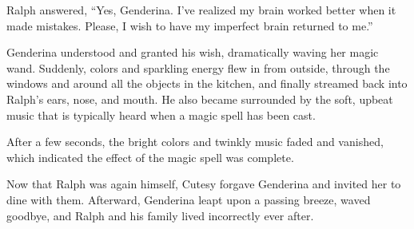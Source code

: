 Ralph answered, “Yes, Genderina. I've realized my brain worked better when it made mistakes. Please, I wish to have my imperfect brain returned to me.”

Genderina understood and granted his wish, dramatically waving her magic wand. Suddenly, colors and sparkling energy flew in from outside, through the windows and around all the objects in the kitchen, and finally streamed back into Ralph's ears, nose, and mouth. He also became surrounded by the soft, upbeat music that is typically heard when a magic spell has been cast.

After a few seconds, the bright colors and twinkly music faded and vanished, which indicated the effect of the magic spell was complete.

Now that Ralph was again himself, Cutesy forgave Genderina and invited her to dine with them. Afterward, Genderina leapt upon a passing breeze, waved goodbye, and Ralph and his family lived incorrectly ever after.